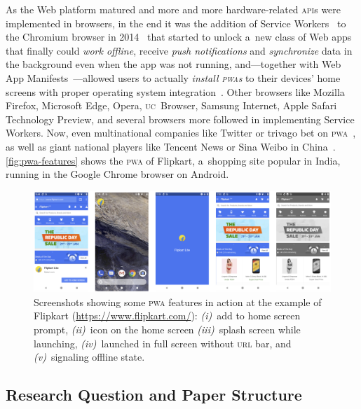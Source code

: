 \documentclass[sigconf]{acmart}
\begin{document}
As the Web platform matured and more and more
hardware-related \textsc{api}s were implemented in browsers,
in the end it was the addition of Service Workers~\cite{russell2017serviceworkers}
to the Chromium browser in 2014~\cite{cooney2014chromium} that started to unlock a~new class of Web apps
that finally could \emph{work offline}, receive \emph{push notifications}
and \emph{synchronize} data in the background even when the app was not running,
and---together with Web App Manifests~\cite{caceres2017manifest}---allowed
users to actually \emph{install \textsc{pwa}s} to their devices' home screens
with proper operating system integration~\cite{kinlan2017a2hs}.
Other browsers like Mozilla Firefox, Microsoft Edge, Opera, \textsc{uc}~Browser, Samsung Internet,
Apple Safari Technology Preview, and several browsers more followed in implementing Service Workers.
Now, even multinational companies like Twitter
or trivago bet on \textsc{pwa}~\cite{gallagher2017twitterlite,twg2017trivago},
as well as giant national players like Tencent News or Sina Weibo in China~\cite{zhu2017pwa}.
\autoref{fig:pwa-features} shows the \textsc{pwa} of Flipkart, a~shopping site popular in India,
running in the Google Chrome browser on Android.

\begin{figure}[hbt]
  \centering
  \includegraphics[width=\columnwidth]{pwa-features}
  \caption[Screenshots showing some \textsc{pwa} features]{
    Screenshots showing some \textsc{pwa} features in action
    at the example of Flipkart (\url{https://www.flipkart.com/}):
    \emph{(i)}~add to home screen prompt, \emph{(ii)}~icon on the home screen
    \emph{(iii)}~splash screen while launching,
    \emph{(iv)}~launched in full screen without \textsc{url} bar, and
    \emph{(v)}~signaling offline state.}
  \label{fig:pwa-features}
\end{figure}

\subsection{Research Question and Paper Structure}
\end{document}
